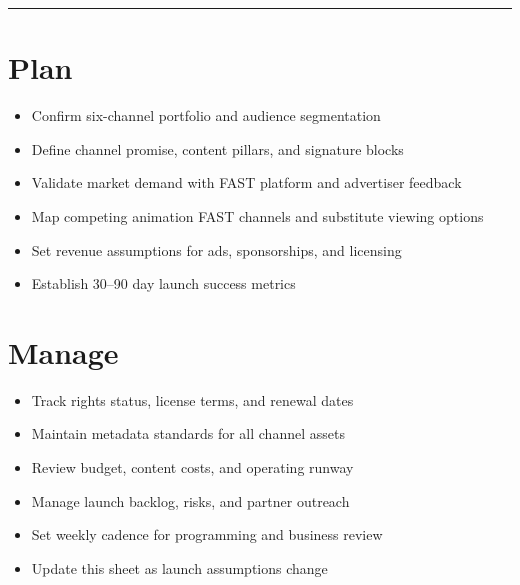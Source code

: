 \documentclass[10pt]{article}
\newcommand{\checkitem}[1]{\item[$\square$] #1}
\begin{document}
\vspace{2pt}
\hrule
\vspace{5pt}

\begin{minipage}[t]{0.49\textwidth}
\section*{Plan}
\begin{itemize}
    \checkitem{Confirm six-channel portfolio and audience segmentation}
    \checkitem{Define channel promise, content pillars, and signature blocks}
    \checkitem{Validate market demand with FAST platform and advertiser feedback}
    \checkitem{Map competing animation FAST channels and substitute viewing options}
    \checkitem{Set revenue assumptions for ads, sponsorships, and licensing}
    \checkitem{Establish 30--90 day launch success metrics}
\end{itemize}

\section*{Manage}
\begin{itemize}
    \checkitem{Track rights status, license terms, and renewal dates}
    \checkitem{Maintain metadata standards for all channel assets}
    \checkitem{Review budget, content costs, and operating runway}
    \checkitem{Manage launch backlog, risks, and partner outreach}
    \checkitem{Set weekly cadence for programming and business review}
    \checkitem{Update this sheet as launch assumptions change}
\end{itemize}
\end{minipage}\hfill
\end{document}
